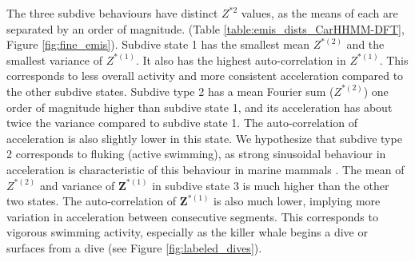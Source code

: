 The three subdive behaviours have distinct $Z^{*2}$ values, as the means of each are separated by an order of magnitude. (Table \ref{table:emis_dists_CarHHMM-DFT}, Figure \ref{fig:fine_emis}). 
Subdive state 1 has the smallest mean $Z^{*(2)}$ and the smallest variance of $Z^{*(1)}$. It also has the highest auto-correlation in $Z^{*(1)}$. This corresponds to less overall activity and more consistent acceleration compared to the other subdive states. 
Subdive type 2 has a mean Fourier sum ($Z^{*(2)}$) one order of magnitude higher than subdive state 1, and its acceleration has about twice the variance compared to subdive state 1. The auto-correlation of acceleration is also slightly lower in this state. We hypothesize that subdive type 2 corresponds to fluking (active swimming), as strong sinusoidal behaviour in acceleration is characteristic of this behaviour in marine mammals \citep{Simon:2012}.
The mean of $Z^{*(2)}$ and variance of $\mathbf{Z}^{*(1)}$ in subdive state 3 is much higher than the other two states. The auto-correlation of $\mathbf{Z}^{*(1)}$ is also much lower, implying more variation in acceleration between consecutive segments. This corresponds to vigorous swimming activity, especially as the killer whale begins a dive or surfaces from a dive (see Figure \ref{fig:labeled_dives}). 

